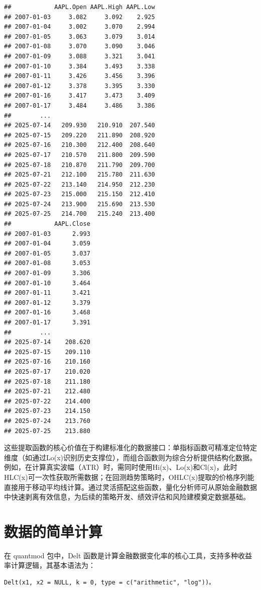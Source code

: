 \documentclass[]{ctexbook}
\begin{document}
\begin{verbatim}
##            AAPL.Open AAPL.High AAPL.Low
## 2007-01-03     3.082     3.092    2.925
## 2007-01-04     3.002     3.070    2.994
## 2007-01-05     3.063     3.079    3.014
## 2007-01-08     3.070     3.090    3.046
## 2007-01-09     3.088     3.321    3.041
## 2007-01-10     3.384     3.493    3.338
## 2007-01-11     3.426     3.456    3.396
## 2007-01-12     3.378     3.395    3.330
## 2007-01-16     3.417     3.473    3.409
## 2007-01-17     3.484     3.486    3.386
##        ...                             
## 2025-07-14   209.930   210.910  207.540
## 2025-07-15   209.220   211.890  208.920
## 2025-07-16   210.300   212.400  208.640
## 2025-07-17   210.570   211.800  209.590
## 2025-07-18   210.870   211.790  209.700
## 2025-07-21   212.100   215.780  211.630
## 2025-07-22   213.140   214.950  212.230
## 2025-07-23   215.000   215.150  212.410
## 2025-07-24   213.900   215.690  213.530
## 2025-07-25   214.700   215.240  213.400
##            AAPL.Close
## 2007-01-03      2.993
## 2007-01-04      3.059
## 2007-01-05      3.037
## 2007-01-08      3.053
## 2007-01-09      3.306
## 2007-01-10      3.464
## 2007-01-11      3.421
## 2007-01-12      3.379
## 2007-01-16      3.468
## 2007-01-17      3.391
##        ...           
## 2025-07-14    208.620
## 2025-07-15    209.110
## 2025-07-16    210.160
## 2025-07-17    210.020
## 2025-07-18    211.180
## 2025-07-21    212.480
## 2025-07-22    214.400
## 2025-07-23    214.150
## 2025-07-24    213.760
## 2025-07-25    213.880
\end{verbatim}

这些提取函数的核心价值在于构建标准化的数据接口：单指标函数可精准定位特定维度（如通过Lo(x)识别历史支撑位），而组合函数则为综合分析提供结构化数据。例如，在计算真实波幅（ATR）时，需同时使用Hi(x)、Lo(x)和Cl(x)，此时HLC(x)可一次性获取所需数据；在回测趋势策略时，OHLC(x)提取的价格序列能直接用于移动平均线计算。通过灵活搭配这些函数，量化分析师可从原始金融数据中快速剥离有效信息，为后续的策略开发、绩效评估和风险建模奠定数据基础。

\section{数据的简单计算}\label{ux6570ux636eux7684ux7b80ux5355ux8ba1ux7b97}

在 quantmod 包中，Delt 函数是计算金融数据变化率的核心工具，支持多种收益率计算逻辑，其基本语法为：

\begin{verbatim}
Delt(x1, x2 = NULL, k = 0, type = c("arithmetic", "log"))。
\end{verbatim}
\end{document}
